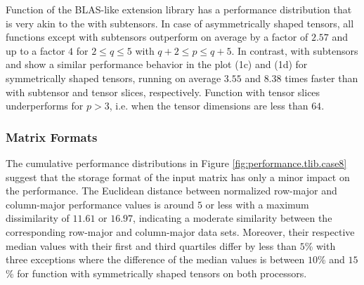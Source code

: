 Function  of the BLAS-like extension library has a performance distribution that is very akin to the  with subtensors.
In case of asymmetrically shaped tensors, all functions except  with subtensors outperform  on average by a factor of $2.57$ and up to a factor $4$ for $2 \leq q\leq5$ with $q+2 \leq p \leq q+5$. %
In contrast,  with subtensors and  show a similar performance behavior in the plot (1c) and (1d) for symmetrically shaped tensors, running on average $3.55$ and $8.38$ times faster than  with subtensor and tensor slices, respectively.
Function  with tensor slices underperforms for $p>3$, i.e. when the tensor dimensions are less than $64$.



\subsubsection{Matrix Formats}
The cumulative performance distributions in Figure \ref{fig:performance.tlib.case8} suggest that the storage format of the input matrix has only a minor impact on the performance.
The Euclidean distance between normalized row-major and column-major performance values is around $5$ or less with a maximum dissimilarity of $11.61$ or $16.97$, indicating a moderate similarity between the corresponding row-major and column-major data sets.
Moreover, their respective median values with their first and third quartiles differ by less than $5$\% with three exceptions where the difference of the median values is between $10$\% and $15$\% for function  with symmetrically shaped tensors on both processors.


